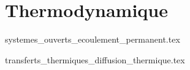 \part{Thermodynamique}

{systemes_ouverts_ecoulement_permanent.tex}

{transferts_thermiques_diffusion_thermique.tex}